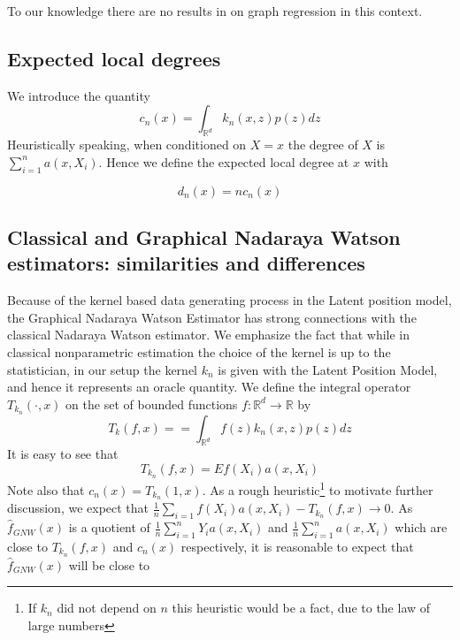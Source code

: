 \documentclass{article}
\begin{document}
To our knowledge there are no results in on graph regression in this context.


\subsection{Expected local degrees}
We introduce the quantity 
\begin{equation}
\label{c_n_eqn}
    c_n(x)=\int_{\mathbb{R}^d} k_n(x,z)p(z)dz
\end{equation}
Heuristically speaking, when conditioned on $X=x$ the degree of $X$ is
$\sum_{i=1}^n a(x,X_i)$. Hence we define the expected local degree at $x$ with

\begin{equation}
\label{local_degree}
    d_n(x)=nc_n(x)
\end{equation}

\subsection{Classical and Graphical Nadaraya Watson estimators: similarities and differences}

Because of the kernel based data generating process in the Latent position model, the Graphical Nadaraya Watson Estimator has strong connections with the classical Nadaraya Watson estimator. We emphasize the fact that while in classical nonparametric estimation the choice of the kernel is up to the statistician, in our setup the kernel $k_n$ is given with the Latent Position Model, and hence it represents an oracle quantity. We define the integral operator $T_{k_n}(\cdot,x)$ on the set of bounded functions  $f\colon\mathbb{R}^d\to\mathbb{R}$ by
\begin{equation}
\label{T_n_eqn}
    T_k(f,x)==\int_{\mathbb{R}^d}f(z)k_n(x,z)p(z)dz
\end{equation}
It is easy to see that 
\begin{equation}
    T_{k_n}(f,x)=Ef(X_i)a(x,X_i)
\end{equation}
Note also that $c_n(x)=T_{k_n}(1,x)$.
As a rough heuristic\footnote{If $k_n$ did not depend on $n$ this heuristic would be a fact, due to the law of large numbers} to motivate further discussion, we expect that $\frac{1}{n}\sum_{i=1}f(X_i)a(x,X_i)-T_{k_n}(f,x)\to 0$. As $\hat{f}_{GNW}(x)$ is a quotient of $\frac{1}{n}\sum_{i=1}^n Y_ia(x,X_i)$ and $\frac{1}{n}\sum_{i=1}^na(x,X_i)$
which are close to $T_{k_n}(f,x)$ and $c_n(x)$ respectively, it is reasonable to expect that $\hat{f}_{GNW}(x)$ will be close to
\end{document}
